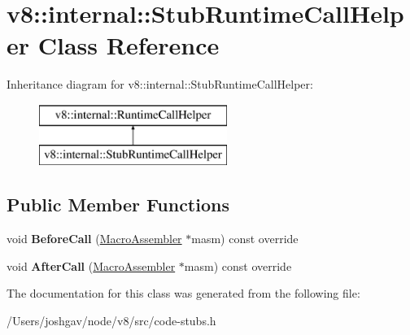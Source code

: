 \hypertarget{classv8_1_1internal_1_1_stub_runtime_call_helper}{}\section{v8\+:\+:internal\+:\+:Stub\+Runtime\+Call\+Helper Class Reference}
\label{classv8_1_1internal_1_1_stub_runtime_call_helper}
Inheritance diagram for v8\+:\+:internal\+:\+:Stub\+Runtime\+Call\+Helper\+:\begin{figure}[H]
\begin{center}
\leavevmode
\includegraphics[height=2.000000cm]{classv8_1_1internal_1_1_stub_runtime_call_helper}
\end{center}
\end{figure}
\subsection*{Public Member Functions}
\begin{DoxyCompactItemize}
\item 
void {\bfseries Before\+Call} (\hyperlink{classv8_1_1internal_1_1_macro_assembler}{Macro\+Assembler} $\ast$masm) const  override\hypertarget{classv8_1_1internal_1_1_stub_runtime_call_helper_a7f6a06882c320bc9d898ef724da95b82}{}\label{classv8_1_1internal_1_1_stub_runtime_call_helper_a7f6a06882c320bc9d898ef724da95b82}

\item 
void {\bfseries After\+Call} (\hyperlink{classv8_1_1internal_1_1_macro_assembler}{Macro\+Assembler} $\ast$masm) const  override\hypertarget{classv8_1_1internal_1_1_stub_runtime_call_helper_af797858db21eb0406e3c1d36e408e8b0}{}\label{classv8_1_1internal_1_1_stub_runtime_call_helper_af797858db21eb0406e3c1d36e408e8b0}

\end{DoxyCompactItemize}


The documentation for this class was generated from the following file\+:\begin{DoxyCompactItemize}
\item 
/\+Users/joshgav/node/v8/src/code-\/stubs.\+h\end{DoxyCompactItemize}
